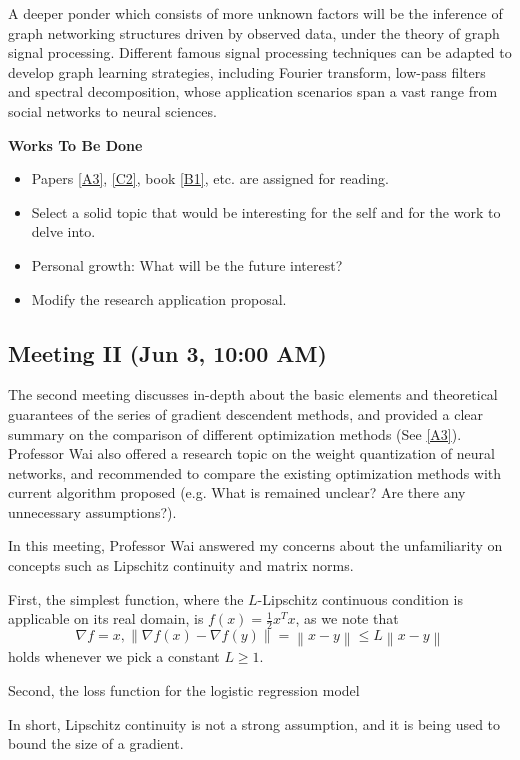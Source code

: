 \documentclass[10pt,a4paper]{article}
\begin{document}
A deeper ponder which consists of more unknown factors will be the inference of graph networking structures driven by observed data, under the theory of graph signal processing. Different famous signal processing techniques can be adapted to develop graph learning strategies, including Fourier transform, low-pass filters and spectral decomposition, whose application scenarios span a vast range from social networks to neural sciences.

\noindent\textbf{Works To Be Done}

\begin{itemize}
     \item Papers \ref{A3}, \ref{C2}, book \ref{B1}, etc. are assigned for reading.
     \item Select a solid topic that would be interesting for the self and for the work to delve into.
     \item Personal growth: What will be the future interest?
     \item Modify the research application proposal.
\end{itemize}

\subsection{Meeting II (Jun 3, 10:00 AM)} The second meeting discusses in-depth about the basic elements and theoretical guarantees of the series of gradient descendent methods, and provided a clear summary on the comparison of different optimization methods (See \ref{A3}). Professor Wai also offered a research topic on the weight quantization of neural networks, and recommended to compare the existing optimization methods with current algorithm proposed (e.g. What is remained unclear? Are there any unnecessary assumptions?).

In this meeting, Professor Wai answered my concerns about the unfamiliarity on concepts such as Lipschitz continuity and matrix norms.

First, the simplest function, where the $L$-Lipschitz continuous condition is applicable on its real domain, is $f(x)=\frac{1}{2} x^T x$, as we note that $$\nabla f=x, \left\lVert \nabla f(x) - \nabla f(y)\right\rVert = \left\lVert x-y \right\rVert \leq L \left\lVert x-y\right\rVert$$ holds whenever we pick a constant $L\geq1$.

Second, the loss function for the logistic regression model

In short, Lipschitz continuity is not a strong assumption, and it is being used to bound the size of a gradient.
\end{document}
